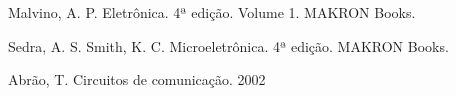 \begin{thebibliography}{3}

{\sc Malvino, A. P. Eletrônica. 4ª edição. Volume 1. MAKRON Books.}

{\sc Sedra, A. S. Smith, K. C. Microeletrônica. 4ª edição. MAKRON Books.}

{\sc Abrão, T. Circuitos de comunicação. 2002}

\end{thebibliography}